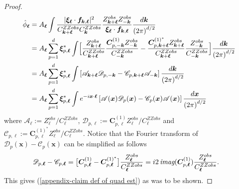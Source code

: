 \documentclass[10pt,noinfoline]{imsart}
\newcommand{\bs}{\boldsymbol}
\begin{document}
\begin{proof}
\begin{align}
\hat\phi_{\bs\ell}
& = A_{\bs\ell}\int \frac{|\bs \xi_{\bs \ell}\cdot \bs f_{\bs k,\bs\ell}|^2}{C^{ZZobs}_{\bs k+\bs \ell} C^{ZZobs}_{\bs k}}\frac{Z^{obs}_{\bs k+\bs \ell}Z^{obs}_{-\bs k}}{\bs \xi_{\bs \ell}\cdot \bs f_{\bs k,\bs\ell}} \frac{d\bs k}{{(2\pi)}^{d/2}} \nonumber\\
& =  A_{\bs\ell}\sum_{p=1}^d \bs\xi^*_{p,\bs \ell}\int
\Bigl[
  \frac{Z^{obs}_{\bs k+\bs \ell}}{C^{ZZobs}_{\bs k+\bs \ell} }\frac{\bs C^{(1)}_{p,-\bs k} Z^{obs}_{-\bs k}}{C^{ZZobs}_{-\bs k}}
- \frac{\bs C^{{(1)}^*}_{p, \bs k+\bs\ell}Z^{obs}_{\bs k+\bs \ell}}{C^{ZZobs}_{\bs k+\bs \ell} } \frac{Z^{obs}_{-\bs k}}{C^{ZZobs}_{-\bs k}}
\Bigr] \frac{d\bs k}{{(2\pi)}^{d/2}} \nonumber\\
&= A_{\bs\ell}\sum_{p=1}^d \bs\xi^*_{p,\bs \ell} \int
\left[
\mathscr A_{{\bs k+\bs \ell}}\mathscr D_{p,-\bs k}  -
\mathscr C_{p,\bs k+\bs \ell}\mathscr A_{-\bs k}
 \right]  \frac{d\bs k}{{(2\pi)}^{d/2}} \nonumber \\
 &= A_{\bs\ell}\sum_{p=1}^d \bs\xi^*_{p,\bs \ell} \int
 e^{-i\bs x\cdot \bs\ell}
 \left[
 \mathscr A(\bs x)\mathscr D_{p}(\bs x)  -
 \mathscr C_{p}(\bs x)\mathscr A(\bs x)
  \right]  \frac{d\bs x}{{(2\pi)}^{d/2}} \label{first quad est form in proof}
\end{align}
where $\mathscr A_{\bs\ell}:= Z^{obs}_{\bs\ell}/ C^{ZZobs}_{\bs\ell}$, $\mathscr D_{p,\bs\ell}:=\bs C^{(1)}_{p,\bs\ell}Z^{obs}_{\bs\ell}/C^{ZZobs}_{\bs\ell}$ and $\mathscr C_{p,\bs\ell}:=\bs C^{{(1)}^*}_{p,\bs\ell}Z^{obs}_{\bs\ell}/C^{ZZobs}_{\bs\ell}$. Notice that the Fourier transform of $\mathscr D_{p}(\bs x)  - \mathscr C_{p}(\bs x)$ can be simplified as follows
\begin{align*}
\mathscr D_{p,\bs \ell}  - \mathscr C_{p,\bs \ell}
& = \bigl[\bs C^{(1)}_{p,\bs \ell} - \bs C^{{(1)}^*}_{p,\bs \ell}\bigr]\frac{Z^{obs}_{\bs\ell}}{C^{ZZobs}_{\bs\ell}} 
 = i 2 \textit{\,imag}(\bs C^{(1)}_{p,\bs\ell})\frac{Z^{obs}_{\bs\ell}}{C^{ZZobs}_{\bs\ell}}.
\end{align*}
This gives (\ref{appendix-claim def of quad est}) as was to be shown.


\end{proof}
\end{document}
